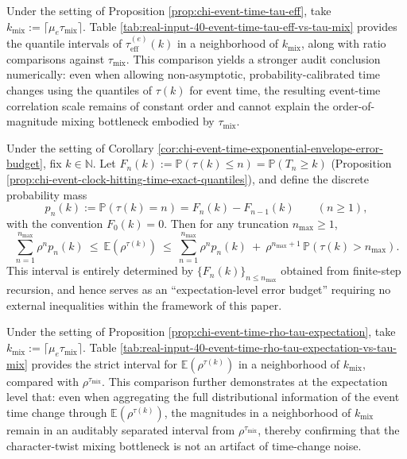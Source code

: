\begin{remark}
\label{cor:chi-event-time-tau-eff-vs-tau-mix}
Under the setting of Proposition \ref{prop:chi-event-time-tau-eff}, take $k_{\mathrm{mix}}:=\lceil\mu_e\tau_{\mathrm{mix}}\rceil$.
Table \ref{tab:real-input-40-event-time-tau-eff-vs-tau-mix} provides the quantile intervals of $\tau_{\mathrm{eff}}^{(e)}(k)$ in a neighborhood of $k_{\mathrm{mix}}$, along with ratio comparisons against $\tau_{\mathrm{mix}}$.
This comparison yields a stronger audit conclusion numerically: even when allowing non-asymptotic, probability-calibrated time changes using the quantiles of $\tau(k)$ for event time, the resulting event-time correlation scale remains of constant order and cannot explain the order-of-magnitude mixing bottleneck embodied by $\tau_{\mathrm{mix}}$.
\end{remark}



\begin{remark}
\label{prop:chi-event-time-rho-tau-expectation}
Under the setting of Corollary \ref{cor:chi-event-time-exponential-envelope-error-budget}, fix $k\in\mathbb{N}$.
Let $F_n(k):=\mathbb{P}(\tau(k)\le n)=\mathbb{P}(T_n\ge k)$ (Proposition \ref{prop:chi-event-clock-hitting-time-exact-quantiles}), and define the discrete probability mass
$$
p_n(k):=\mathbb{P}(\tau(k)=n)=F_n(k)-F_{n-1}(k)\qquad (n\ge 1),
$$
with the convention $F_0(k)=0$.
Then for any truncation $n_{\max}\ge 1$,
$$
\sum_{n=1}^{n_{\max}}\rho^n p_n(k)\ \le\ \mathbb{E}(\rho^{\tau(k)})\ \le\ \sum_{n=1}^{n_{\max}}\rho^n p_n(k)\ +\ \rho^{n_{\max}+1}\,\mathbb{P}(\tau(k)>n_{\max}).
$$
This interval is entirely determined by $\{F_n(k)\}_{n\le n_{\max}}$ obtained from finite-step recursion, and hence serves as an ``expectation-level error budget'' requiring no external inequalities within the framework of this paper.
\end{remark}

\begin{remark}
\label{cor:chi-event-time-rho-tau-expectation-vs-tau-mix}
Under the setting of Proposition \ref{prop:chi-event-time-rho-tau-expectation}, take $k_{\mathrm{mix}}:=\lceil\mu_e\tau_{\mathrm{mix}}\rceil$.
Table \ref{tab:real-input-40-event-time-rho-tau-expectation-vs-tau-mix} provides the strict interval for $\mathbb{E}(\rho^{\tau(k)})$ in a neighborhood of $k_{\mathrm{mix}}$, compared with $\rho^{\tau_{\mathrm{mix}}}$.
This comparison further demonstrates at the expectation level that: even when aggregating the full distributional information of the event time change through $\mathbb{E}(\rho^{\tau(k)})$, the magnitudes in a neighborhood of $k_{\mathrm{mix}}$ remain in an auditably separated interval from $\rho^{\tau_{\mathrm{mix}}}$, thereby confirming that the character-twist mixing bottleneck is not an artifact of time-change noise.
\end{remark}

